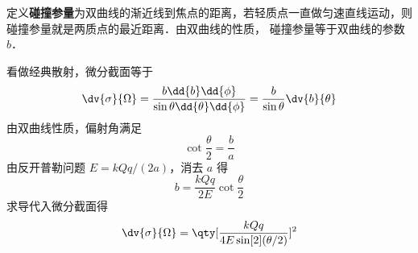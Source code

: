 定义\textbf{碰撞参量}为双曲线的渐近线到焦点的距离，若轻质点一直做匀速直线运动，则碰撞参量就是两质点的最近距离．由双曲线的性质，%
碰撞参量等于双曲线的参数 $b$．

看做经典散射，微分截面等于
\begin{equation}
\dv{\sigma}{\Omega} = \frac{b \dd{b}\dd{\phi} }{\sin \theta \dd{\theta} \dd{\phi} } = \frac{b}{\sin \theta }\dv{b}{\theta}
\end{equation}
由双曲线性质，偏射角满足
\begin{equation}
\cot{\frac{\theta }{2}}= \frac{b}{a}
\end{equation}
由反开普勒问题  $E = kQq/(2a)$，消去 $a$ 得
\begin{equation}
b = \frac{kQq}{2E}\cot {\frac{\theta }{2}}
\end{equation}
求导代入微分截面得
\begin{equation}\label{RuthSc_eq1}
\dv{\sigma}{\Omega} = \qty[ \frac{kQq}{4E \sin[2](\theta /2)} ]^2
\end{equation}
